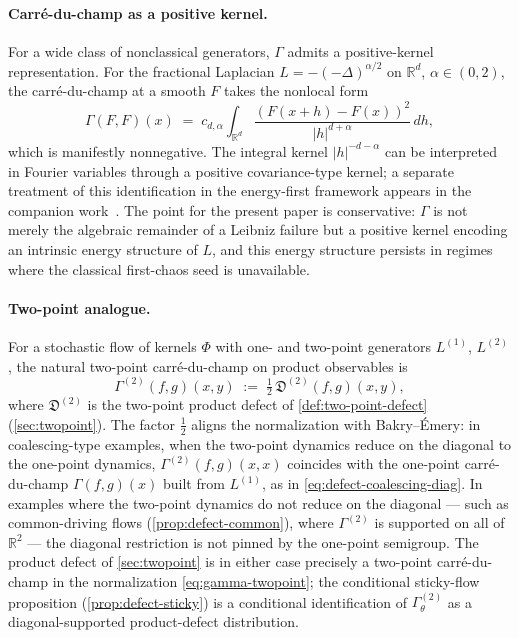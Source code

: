 \documentclass[11pt,reqno]{amsart}
\theoremstyle{plain}
\theoremstyle{definition}
\theoremstyle{remark}
\newcommand{\R}{\mathbb{R}}
\begin{document}
\paragraph{Carr\'e-du-champ as a positive kernel.}
For a wide class of nonclassical generators, $\Gamma$ admits a
positive-kernel representation. For the fractional Laplacian
$L=-(-\Delta)^{\alpha/2}$ on $\R^d$, $\alpha\in(0,2)$, the
carr\'e-du-champ at a smooth $F$ takes the nonlocal form
\begin{equation}\label{eq:cdc-frac}
  \Gamma(F,F)(x)
  \;=\;c_{d,\alpha}\int_{\R^{d}}\frac{(F(x+h)-F(x))^{2}}{|h|^{d+\alpha}}\,dh,
\end{equation}
which is manifestly nonnegative. The integral kernel
$|h|^{-d-\alpha}$ can be interpreted in Fourier variables through a
positive covariance-type kernel; a separate treatment of this
identification in the energy-first framework appears in the
companion work~\cite{FontesFracBE}. The point for the present paper
is conservative: $\Gamma$ is not merely the algebraic remainder of a
Leibniz failure but a positive kernel encoding an intrinsic energy
structure of $L$, and this energy structure persists in regimes where
the classical first-chaos seed is unavailable.

\paragraph{Two-point analogue.}
For a stochastic flow of kernels $\Phi$ with one- and two-point
generators $L^{(1)}$, $L^{(2)}$, the natural two-point
carr\'e-du-champ on product observables is
\begin{equation}\label{eq:gamma-twopoint}
  \Gamma^{(2)}(f,g)(x,y)\;:=\;\tfrac{1}{2}\,\mathfrak D^{(2)}(f,g)(x,y),
\end{equation}
where $\mathfrak D^{(2)}$ is the two-point product defect of
\cref{def:two-point-defect} (\cref{sec:twopoint}). The factor
$\tfrac{1}{2}$ aligns the normalization with Bakry--\'Emery: in
coalescing-type examples, when the two-point dynamics reduce on the
diagonal to the one-point dynamics, $\Gamma^{(2)}(f,g)(x,x)$
coincides with the one-point carr\'e-du-champ $\Gamma(f,g)(x)$ built
from $L^{(1)}$, as in \eqref{eq:defect-coalescing-diag}. In examples
where the two-point dynamics do not reduce on the diagonal --- such
as common-driving flows (\cref{prop:defect-common}), where
$\Gamma^{(2)}$ is supported on all of $\R^{2}$ --- the diagonal
restriction is not pinned by the one-point semigroup. The product
defect of \cref{sec:twopoint} is in either case precisely a
two-point carr\'e-du-champ in the normalization
\eqref{eq:gamma-twopoint}; the conditional sticky-flow proposition
(\cref{prop:defect-sticky}) is a conditional identification of
$\Gamma^{(2)}_{\theta}$ as a diagonal-supported product-defect
distribution.
\end{document}
